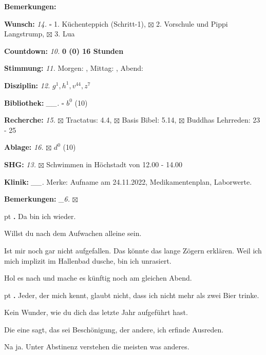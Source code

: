 \documentclass[10pt,a4paper]{article}
\newcounter{notec}
\newcommand\notep[1]{%
  \stepcounter{notec}
  \vskip #1pt
  {\bf\arabic{notec}.}
}
\newcommand\rewo[1] {{\color {aqua} {\bf #1}}}                 %
\newcommand\opti[1] {{\color {amethyst} {\bf #1}}}             %
\newcommand\mand[1] {{\color {burntorange} {\bf #1}}}          %
\newcommand\bottomspace{\vskip 4pt}
\newcommand\n[1] { {\sl #1.} \hskip 5pt }
\begin{document}
\begin{mdframed}[style=daystyle]
\begin{labeling}{{\mand {Bemerkungen:}}}
\begin{minipage}{0.75\textwidth}
    \end{minipage}
    \bottomspace
  \item[{\mand {Wunsch:}}]         \n{14} $\square$ 1. Küchenteppich (Schritt-1),
      $\boxtimes$ 2. Vorschule und Pippi Langstrump, $\boxtimes$ 3. Lua
  \item[{\mand {Countdown:}}]      \n{10} {\rewo {0 (0) 16 Stunden}}
  \item[{\mand {Stimmung:}}]       \n{11} Morgen: , Mittag: , Abend: 
  \item[{\mand {Disziplin:}}]      \n{12} $g^{1}, h^{1}, v^{44}, z^{7}$
  \item[{\mand {Bibliothek:}}]   \n{\_\_} $\square$ $b^{0}$ (10)
  \item[{\mand {Recherche:}}]      \n{15} $\boxtimes$ Tractatus: 4.4, $\boxtimes$ Basis Bibel: 5.14,
      $\boxtimes$ Buddhas Lehrreden: 23 - 25
  \item[{\mand {Ablage:}}]         \n{16} $\boxtimes$ $d^{0}$ (10)
  \item[{\mand {SHG:}}]            \n{13} $\boxtimes$ Schwimmen in Höchstadt von 12.00 - 14.00
  \item[{\opti {Klinik:}}]       \n{\_\_} Merke: Aufname am 24.11.2022, Medikamentenplan, Laborwerte.
  \item[{\mand {Bemerkungen:}}]   \n{\_6} $\boxtimes$
  \end{labeling}
    
  \setcounter{notec}{0}
  
  \notep 0 Da bin ich wieder.

  \vskip 2pt
  Willst du nach dem Aufwachen alleine sein.

  \vskip 2pt
  Ist mir noch gar nicht aufgefallen. Das könnte das lange Zögern erklären. Weil
  ich mich implizit im Hallenbad dusche, bin ich unrasiert.

  \vskip 2pt
  Hol es nach und mache es künftig noch am gleichen Abend.


  \notep 4 Jeder, der mich kennt, glaubt nicht, dass ich nicht mehr als zwei
  Bier trinke.

  \vskip 2pt
  Kein Wunder, wie du dich das letzte Jahr aufgeführt hast.

  \vskip 2pt
  Die eine sagt, das sei Beschönigung, der andere, ich erfinde Ausreden.

  \vskip 2pt
  Na ja. Unter Abstinenz verstehen die meisten was anderes.


\end{mdframed}
\end{document}
